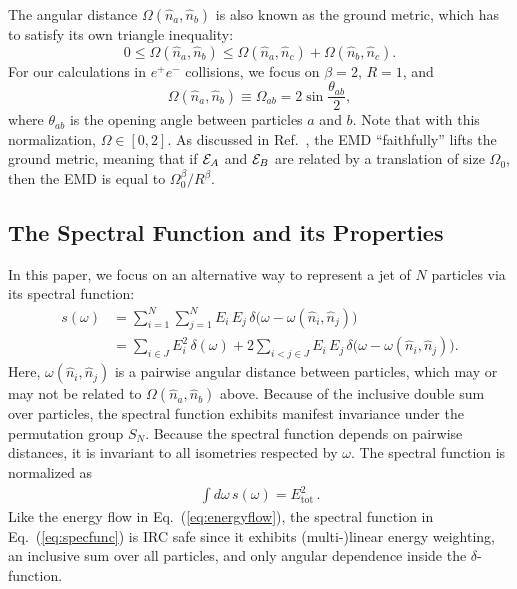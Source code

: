 \documentclass[letterpaper,11pt]{article}
\DeclareRobustCommand{\Eq}[1]{Eq.~(\ref{#1})}
\DeclareRobustCommand{\InRef}[1]{Ref.~\cite{#1}}
\begin{document}
The angular distance $\Omega(\hat{n}_a,\hat{n}_b)$ is also known as the ground metric, which has to satisfy its own triangle inequality:
%
\begin{equation}
0 \le \Omega(\hat{n}_a,\hat{n}_b) \le \Omega(\hat{n}_a,\hat{n}_c) + \Omega(\hat{n}_b,\hat{n}_c).
\end{equation}
%
For our calculations in $e^+ e^-$ collisions, we focus on $\beta = 2$, $R = 1$, and
%
\begin{equation}
\label{eq:capital_omega_def}
\Omega(\hat{n}_a,\hat{n}_b) \equiv \Omega_{ab} = 2 \sin \frac{\theta_{ab}}{2},
\end{equation}
%
where $\theta_{ab}$ is the opening angle between particles $a$ and $b$.
%
Note that with this normalization, $\Omega \in [0,2]$.
%
As discussed in \InRef{Ba:2023hix}, the EMD ``faithfully'' lifts the ground metric, meaning that if ${\cal E}_A$ and ${\cal E}_B$ are related by a translation of size $\Omega_0$, then the EMD is equal to $\Omega_0^\beta / R^\beta$.

\subsection{The Spectral Function and its Properties}
\label{sec:spectralfunctionproperties}

In this paper, we focus on an alternative way to represent a jet of $N$ particles via its spectral function:
%
\begin{align}
\label{eq:specfunc}
s(\omega) &= \sum_{i = 1}^N \sum_{j = 1}^N E_i\, E_j \,\delta \big(\omega-\omega(\hat{n}_i,\hat{n}_j) \big)\\
&= \sum_{i \in J} E_i^2 \, \delta(\omega) + 2 \sum_{i<j \in J} E_i \, E_j\,\delta \big(\omega-\omega(\hat{n}_i,\hat{n}_j) \big).\nonumber
\end{align}
%
Here, $\omega(\hat{n}_i,\hat{n}_j)$ is a pairwise angular distance between particles, which may or may not be related to $\Omega(\hat{n}_a,\hat{n}_b)$ above.
%
Because of the inclusive double sum over particles, the spectral function exhibits manifest invariance under the permutation group $S_N$.
%
Because the spectral function depends on pairwise distances, it is invariant to all isometries respected by $\omega$.
%
The spectral function is normalized as
%
\begin{align}
\int  d \omega \, s(\omega) = E^2_\text{tot}\,.
\end{align}
%
Like the energy flow in \Eq{eq:energyflow}, the spectral function in \Eq{eq:specfunc} is IRC safe since it exhibits (multi-)linear energy weighting, an inclusive sum over all particles, and only angular dependence inside the $\delta$-function.
\end{document}

